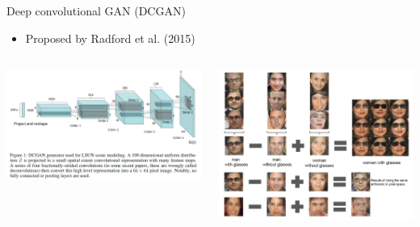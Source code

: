 \documentclass[dvipdfmx,presentation]{beamer}
\begin{document}
\begin{frame}[label={sec:orgheadline30}]{Deep convolutional GAN (DCGAN)}
\begin{itemize}
\item Proposed by Radford et al. (2015)
\end{itemize}
\begin{columns}
\begin{column}{0.50\columnwidth}
\centering
\includegraphics[width=\textwidth]{./figure/radford2015fig1.png}
\end{column}
\begin{column}{0.50\columnwidth}
\centering
\includegraphics[width=\textwidth]{./figure/radford2015fig7.png}
\end{column}
\end{columns}
\end{frame}
\end{document}
